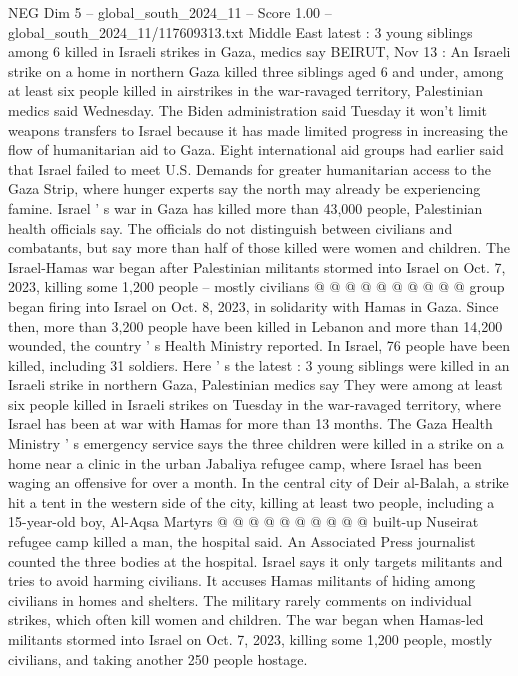 \begin{textsample}{NEG Dim 5 – global\_south\_2024\_11 – Score 1.00 – global\_south\_2024\_11/117609313.txt}  \label{ex:f5_neg_426}
Middle East latest : 3 young siblings among 6 killed in Israeli strikes in Gaza, medics say BEIRUT, Nov 13 : An Israeli strike on a home in northern Gaza killed three siblings aged 6 and under, among at least six people killed in airstrikes in the war-ravaged territory, Palestinian medics said Wednesday.
The Biden administration said Tuesday it won't limit weapons transfers to Israel because it has made limited progress in increasing the flow of humanitarian aid to Gaza.
Eight international aid groups had earlier said that Israel failed to meet U.S.
Demands for greater humanitarian access to the Gaza Strip, where hunger experts say the north may already be experiencing famine.
Israel ' s war in Gaza has killed more than 43,000 people, Palestinian health officials say.
The officials do not distinguish between civilians and combatants, but say more than half of those killed were women and children.
The Israel-Hamas war began after Palestinian militants stormed into Israel on Oct. 7, 2023, killing some 1,200 people -- mostly civilians @ @ @ @ @ @ @ @ @ @ group began firing into Israel on Oct. 8, 2023, in solidarity with Hamas in Gaza.
Since then, more than 3,200 people have been killed in Lebanon and more than 14,200 wounded, the country ' s Health Ministry reported.
In Israel, 76 people have been killed, including 31 soldiers.
Here ' s the latest : 3 young siblings were killed in an Israeli strike in northern Gaza, Palestinian medics say They were among at least six people killed in Israeli strikes on Tuesday in the war-ravaged territory, where Israel has been at war with Hamas for more than 13 months.
The Gaza Health Ministry ' s emergency service says the three children were killed in a strike on a home near a clinic in the urban Jabaliya refugee camp, where Israel has been waging an offensive for over a month.
In the central city of Deir al-Balah, a strike hit a tent in the western side of the city, killing at least two people, including a 15-year-old boy, Al-Aqsa Martyrs @ @ @ @ @ @ @ @ @ @ built-up Nuseirat refugee camp killed a man, the hospital said.
An Associated Press journalist counted the three bodies at the hospital.
Israel says it only targets militants and tries to avoid harming civilians.
It accuses Hamas militants of hiding among civilians in homes and shelters.
The military rarely comments on individual strikes, which often kill women and children.
The war began when Hamas-led militants stormed into Israel on Oct. 7, 2023, killing some 1,200 people, mostly civilians, and taking another 250 people hostage.

\end{textsample}

